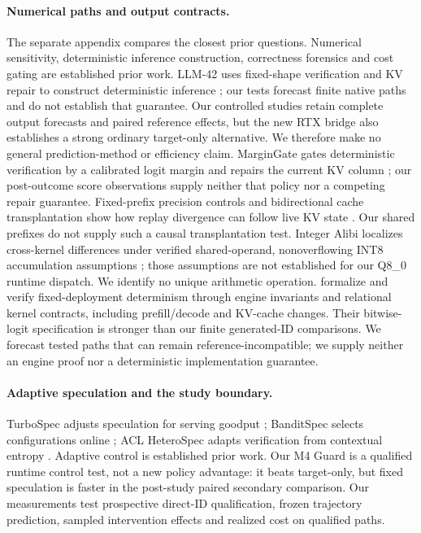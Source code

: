 \paragraph{Numerical paths and output contracts.}
The separate appendix compares the closest prior questions. Numerical sensitivity, deterministic inference construction, correctness forensics and cost gating are established prior work. LLM-42 uses fixed-shape verification and KV repair to construct deterministic inference \citep{llm42}; our tests forecast finite native paths and do not establish that guarantee. Our controlled studies retain complete output forecasts and paired reference effects, but the new RTX bridge also establishes a strong ordinary target-only alternative. We therefore make no general prediction-method or efficiency claim. MarginGate gates deterministic verification by a calibrated logit margin and repairs the current KV column \citep{margingate}; our post-outcome score observations supply neither that policy nor a competing repair guarantee. Fixed-prefix precision controls and bidirectional cache transplantation show how replay divergence can follow live KV state \citep{stagereplay}. Our shared prefixes do not supply such a causal transplantation test. Integer Alibi localizes cross-kernel differences under verified shared-operand, nonoverflowing INT8 accumulation assumptions \citep{integeralibi}; those assumptions are not established for our Q8\_0 runtime dispatch. We identify no unique arithmetic operation.
\citet{vosti} formalize and verify fixed-deployment determinism through engine invariants and relational kernel contracts, including prefill/decode and KV-cache changes. Their bitwise-logit specification is stronger than our finite generated-ID comparisons. We forecast tested paths that can remain reference-incompatible; we supply neither an engine proof nor a deterministic implementation guarantee.


\paragraph{Adaptive speculation and the study boundary.}
TurboSpec adjusts speculation for serving goodput \citep{turbospec}; BanditSpec selects configurations online \citep{banditspec}; ACL HeteroSpec adapts verification from contextual entropy \citep{aclheterospec}. Adaptive control is established prior work. Our M4 Guard is a qualified runtime control test, not a new policy advantage: it beats target-only, but fixed speculation is faster in the post-study paired secondary comparison. Our measurements test prospective direct-ID qualification, frozen trajectory prediction, sampled intervention effects and realized cost on qualified paths.
